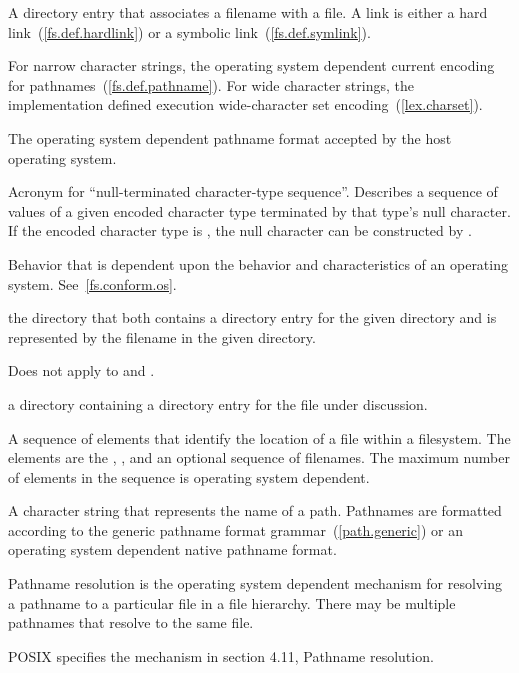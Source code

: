 A directory entry  that associates a
filename with a file. A link is either a hard link~(\ref{fs.def.hardlink}) or a
symbolic link~(\ref{fs.def.symlink}).

For narrow character strings, the operating system dependent current encoding
for pathnames~(\ref{fs.def.pathname}). For wide character strings, the implementation defined execution
wide-character set encoding~(\ref{lex.charset}).

The operating system dependent pathname format accepted by the host operating system.

Acronym for ``null-terminated character-type sequence''. Describes a sequence
of values of a given encoded character type terminated by that type's null character. If
the encoded character type is , the null character can be constructed
by .

Behavior that is dependent upon the behavior
and characteristics of an operating system. See~\ref{fs.conform.os}.

 the directory that both contains a
directory entry for the given directory and is represented by the filename
 in the given directory.
\begin{note} Does not apply to  and . \end{note}

 a directory containing a directory
entry for the file under discussion.

A sequence of elements that identify
the location of a file within a filesystem.
The elements are the
,
,
and an optional sequence of filenames.
The maximum number of elements in the sequence is operating system dependent.

A character string that represents the name of a path. Pathnames are
formatted according to the generic pathname format grammar~(\ref{path.generic}) or an
operating system dependent
native pathname format.

Pathname resolution is the operating system dependent mechanism for resolving
a pathname to a particular file in a file hierarchy. There may be multiple
pathnames that resolve to the same file.
\begin{example} POSIX specifies the mechanism in section 4.11, Pathname resolution.
\end{example}

